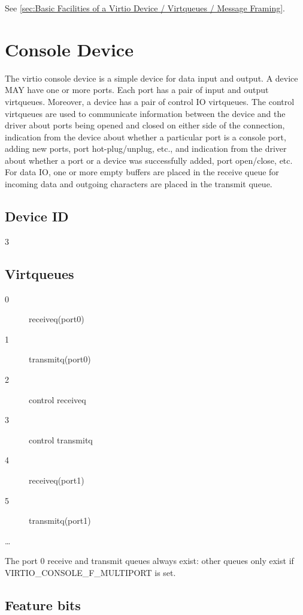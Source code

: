 See \ref{sec:Basic Facilities of a Virtio Device / Virtqueues / Message Framing}.

\section{Console Device}\label{sec:Device Types / Console Device}

The virtio console device is a simple device for data input and
output. A device MAY have one or more ports. Each port has a pair
of input and output virtqueues. Moreover, a device has a pair of
control IO virtqueues. The control virtqueues are used to
communicate information between the device and the driver about
ports being opened and closed on either side of the connection,
indication from the device about whether a particular port is a
console port, adding new ports, port hot-plug/unplug, etc., and
indication from the driver about whether a port or a device was
successfully added, port open/close, etc. For data IO, one or
more empty buffers are placed in the receive queue for incoming
data and outgoing characters are placed in the transmit queue.

\subsection{Device ID}\label{sec:Device Types / Console Device / Device ID}

  3

\subsection{Virtqueues}\label{sec:Device Types / Console Device / Virtqueues}

\begin{description}
\item[0] receiveq(port0)
\item[1] transmitq(port0)
\item[2] control receiveq
\item[3] control transmitq
\item[4] receiveq(port1)
\item[5] transmitq(port1)
\item[\ldots]
\end{description}

The port 0 receive and transmit queues always exist: other queues
only exist if VIRTIO_CONSOLE_F_MULTIPORT is set.

\subsection{Feature bits}\label{sec:Device Types / Console Device / Feature bits}

